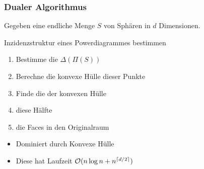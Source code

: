 
\begin{frame}
    \frametitle{Dualer Algorithmus}

    Gegeben eine endliche Menge $S$ von Sphären in $d$ Dimensionen.

    \vfill

    \begin{block}{Inzidenzstruktur eines Powerdiagrammes bestimmen}
        \begin{enumerate}
            \item Bestimme die  $\Delta(\Pi(S))$
            \item Berechne die \alert{konvexe Hülle} dieser Punkte
            \item Finde die  der konvexen Hülle
            \item {} diese Hälfte
            \item {} die Faces in den Originalraum
        \end{enumerate}
    \end{block}

    \vfill

    \begin{itemize}
        \item Dominiert durch Konvexe Hülle
        \item Diese hat Laufzeit $\mathcal{O}(n \log n + n^{\left\lceil d/2\right\rceil})$
    \end{itemize}
\end{frame}



